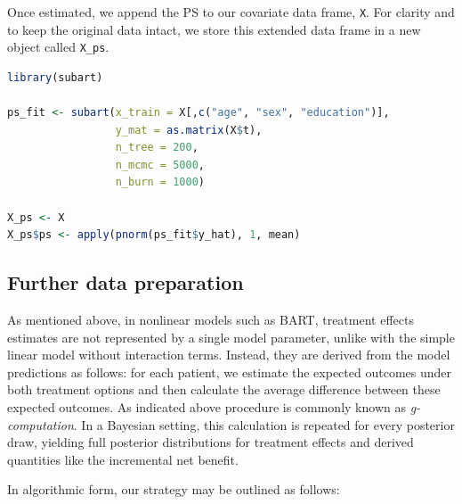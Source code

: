 \documentclass[aoas,preprint]{imsart}
\theoremstyle{plain}
\theoremstyle{definition}
\theoremstyle{remark}
\theoremstyle{remark}
\begin{document}
Once estimated, we append the PS to our covariate data frame, \texttt{X}. For clarity and to keep the original data intact, we store this extended data frame in a new object called \texttt{X\_ps}.

\begin{lstlisting}[language=R, caption= {Estimation of PS by fitting a BART model using the \texttt{subart} package. When the outcome is univariate, \texttt{subart} reduces to fitting a standard BART model.}]
library(subart)

ps_fit <- subart(x_train = X[,c("age", "sex", "education")],
                 y_mat = as.matrix(X$t),
                 n_tree = 200,
                 n_mcmc = 5000,
                 n_burn = 1000)

X_ps <- X
X_ps$ps <- apply(pnorm(ps_fit$y_hat), 1, mean)
\end{lstlisting}

\subsection{Further data preparation}\label{sec:dataprep}
As mentioned above, in nonlinear models such as BART, treatment effects estimates are not represented by a single model parameter, unlike with the simple linear model without interaction terms. Instead, they  are derived from the model predictions as follows: for each patient, we estimate the expected outcomes under both treatment options and then calculate the average difference between these expected outcomes. As indicated above procedure is commonly known as \emph{g-computation}.
In a Bayesian setting, this calculation is repeated for every posterior draw, yielding full posterior distributions for treatment effects and derived quantities like the incremental net benefit.


In algorithmic form, our strategy may be outlined as follows:
\end{document}

